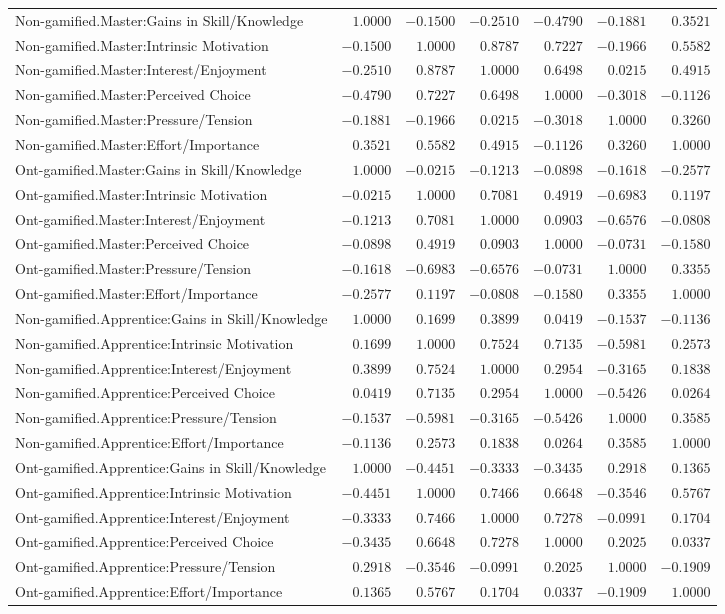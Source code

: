 \begin{landscape}
{\begin{longtable}{lrrrrrr}
Non-gamified.Master:Gains in Skill/Knowledge&$ 1.0000$&$-0.1500$&$-0.2510$&$-0.4790$&$-0.1881$&$ 0.3521$\tabularnewline
Non-gamified.Master:Intrinsic Motivation&$-0.1500$&$ 1.0000$&$ 0.8787$&$ 0.7227$&$-0.1966$&$ 0.5582$\tabularnewline
Non-gamified.Master:Interest/Enjoyment&$-0.2510$&$ 0.8787$&$ 1.0000$&$ 0.6498$&$ 0.0215$&$ 0.4915$\tabularnewline
Non-gamified.Master:Perceived Choice&$-0.4790$&$ 0.7227$&$ 0.6498$&$ 1.0000$&$-0.3018$&$-0.1126$\tabularnewline
Non-gamified.Master:Pressure/Tension&$-0.1881$&$-0.1966$&$ 0.0215$&$-0.3018$&$ 1.0000$&$ 0.3260$\tabularnewline
Non-gamified.Master:Effort/Importance&$ 0.3521$&$ 0.5582$&$ 0.4915$&$-0.1126$&$ 0.3260$&$ 1.0000$\tabularnewline
\hline


Ont-gamified.Master:Gains in Skill/Knowledge&$ 1.0000$&$-0.0215$&$-0.1213$&$-0.0898$&$-0.1618$&$-0.2577$\tabularnewline
Ont-gamified.Master:Intrinsic Motivation&$-0.0215$&$ 1.0000$&$ 0.7081$&$ 0.4919$&$-0.6983$&$ 0.1197$\tabularnewline
Ont-gamified.Master:Interest/Enjoyment&$-0.1213$&$ 0.7081$&$ 1.0000$&$ 0.0903$&$-0.6576$&$-0.0808$\tabularnewline
Ont-gamified.Master:Perceived Choice&$-0.0898$&$ 0.4919$&$ 0.0903$&$ 1.0000$&$-0.0731$&$-0.1580$\tabularnewline
Ont-gamified.Master:Pressure/Tension&$-0.1618$&$-0.6983$&$-0.6576$&$-0.0731$&$ 1.0000$&$ 0.3355$\tabularnewline
Ont-gamified.Master:Effort/Importance&$-0.2577$&$ 0.1197$&$-0.0808$&$-0.1580$&$ 0.3355$&$ 1.0000$\tabularnewline
\hline
\newpage

Non-gamified.Apprentice:Gains in Skill/Knowledge&$ 1.0000$&$ 0.1699$&$ 0.3899$&$ 0.0419$&$-0.1537$&$-0.1136$\tabularnewline
Non-gamified.Apprentice:Intrinsic Motivation&$ 0.1699$&$ 1.0000$&$ 0.7524$&$ 0.7135$&$-0.5981$&$ 0.2573$\tabularnewline
Non-gamified.Apprentice:Interest/Enjoyment&$ 0.3899$&$ 0.7524$&$ 1.0000$&$ 0.2954$&$-0.3165$&$ 0.1838$\tabularnewline
Non-gamified.Apprentice:Perceived Choice&$ 0.0419$&$ 0.7135$&$ 0.2954$&$ 1.0000$&$-0.5426$&$ 0.0264$\tabularnewline
Non-gamified.Apprentice:Pressure/Tension&$-0.1537$&$-0.5981$&$-0.3165$&$-0.5426$&$ 1.0000$&$ 0.3585$\tabularnewline
Non-gamified.Apprentice:Effort/Importance&$-0.1136$&$ 0.2573$&$ 0.1838$&$ 0.0264$&$ 0.3585$&$ 1.0000$\tabularnewline
\hline


Ont-gamified.Apprentice:Gains in Skill/Knowledge&$ 1.0000$&$-0.4451$&$-0.3333$&$-0.3435$&$ 0.2918$&$ 0.1365$\tabularnewline
Ont-gamified.Apprentice:Intrinsic Motivation&$-0.4451$&$ 1.0000$&$ 0.7466$&$ 0.6648$&$-0.3546$&$ 0.5767$\tabularnewline
Ont-gamified.Apprentice:Interest/Enjoyment&$-0.3333$&$ 0.7466$&$ 1.0000$&$ 0.7278$&$-0.0991$&$ 0.1704$\tabularnewline
Ont-gamified.Apprentice:Perceived Choice&$-0.3435$&$ 0.6648$&$ 0.7278$&$ 1.0000$&$ 0.2025$&$ 0.0337$\tabularnewline
Ont-gamified.Apprentice:Pressure/Tension&$ 0.2918$&$-0.3546$&$-0.0991$&$ 0.2025$&$ 1.0000$&$-0.1909$\tabularnewline
Ont-gamified.Apprentice:Effort/Importance&$ 0.1365$&$ 0.5767$&$ 0.1704$&$ 0.0337$&$-0.1909$&$ 1.0000$\tabularnewline
\hline


\end{longtable}}\end{landscape}



